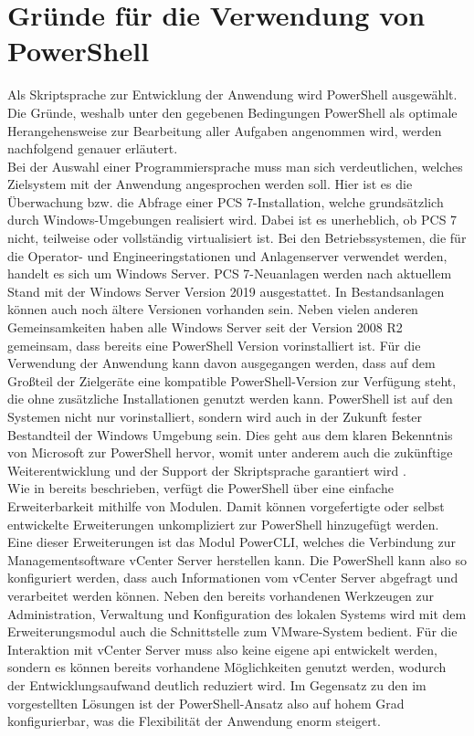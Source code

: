 \section{Gründe für die Verwendung von PowerShell}
Als Skriptsprache zur Entwicklung der Anwendung wird PowerShell ausgewählt. Die Gründe, weshalb unter den gegebenen Bedingungen PowerShell als optimale Herangehensweise zur Bearbeitung aller Aufgaben angenommen wird, werden nachfolgend genauer erläutert.\medskip\\
Bei der Auswahl einer Programmiersprache muss man sich verdeutlichen, welches Zielsystem mit der Anwendung angesprochen werden soll. Hier ist es die Überwachung bzw. die Abfrage einer PCS 7-Installation, welche grundsätzlich durch Windows-Umgebungen realisiert wird. Dabei ist es unerheblich, ob PCS 7 nicht, teilweise oder vollständig virtualisiert ist. Bei den Betriebssystemen, die für die Operator- und Engineeringstationen und Anlagenserver verwendet werden, handelt es sich um Windows Server. PCS 7-Neuanlagen werden nach aktuellem Stand mit der Windows Server Version 2019 ausgestattet. In Bestandsanlagen können auch noch ältere Versionen vorhanden sein. Neben vielen anderen Gemeinsamkeiten haben alle Windows Server seit der Version 2008 R2 gemeinsam, dass bereits eine PowerShell Version vorinstalliert ist. Für die Verwendung der Anwendung kann davon ausgegangen werden, dass auf dem Großteil der Zielgeräte eine kompatible PowerShell-Version zur Verfügung steht, die ohne zusätzliche Installationen genutzt werden kann. PowerShell ist auf den Systemen nicht nur vorinstalliert, sondern wird auch in der Zukunft fester Bestandteil der Windows Umgebung sein. Dies geht aus dem klaren Bekenntnis von Microsoft zur PowerShell hervor, womit unter anderem auch die zukünftige Weiterentwicklung und der Support der Skriptsprache garantiert wird \cite{JoeyAiello032020}.\medskip\\
Wie in  bereits beschrieben, verfügt die PowerShell über eine einfache Erweiterbarkeit mithilfe von Modulen. Damit können vorgefertigte oder selbst entwickelte Erweiterungen unkompliziert zur PowerShell hinzugefügt werden. Eine dieser Erweiterungen ist das Modul PowerCLI, welches die Verbindung zur Managementsoftware vCenter Server herstellen kann. Die PowerShell kann also so konfiguriert werden, dass auch Informationen vom vCenter Server abgefragt und verarbeitet werden können. Neben den bereits vorhandenen Werkzeugen zur Administration, Verwaltung und Konfiguration des lokalen Systems wird mit dem Erweiterungsmodul auch die Schnittstelle zum VMware-System bedient. Für die Interaktion mit vCenter Server muss also keine eigene \acrshort{api} entwickelt werden, sondern es können bereits vorhandene Möglichkeiten genutzt werden, wodurch der Entwicklungsaufwand deutlich reduziert wird. Im Gegensatz zu den im  vorgestellten Lösungen ist der PowerShell-Ansatz also auf hohem Grad konfigurierbar, was die Flexibilität der Anwendung enorm steigert.\medskip\\
